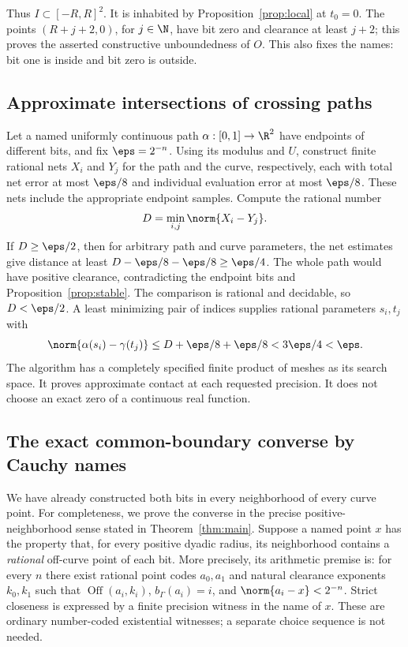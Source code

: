 Thus $I\subset[-R,R]^2$. It is inhabited by
Proposition~\ref{prop:local} at $t_0=0$.
The points $(R+j+2,0)$, for $j\in\N$, have bit zero and
clearance at least $j+2$; this proves the asserted constructive
unboundedness of $O$. This also fixes the names: bit one is
inside and bit zero is outside.

\subsection{Approximate intersections of crossing paths}

Let a named uniformly continuous path $\alpha:[0,1]\to\R^2$
have endpoints of different bits, and fix $\eps=2^{-n}$.
Using its modulus and $U$, construct finite rational nets
$X_i$ and $Y_j$ for the path and the curve, respectively,
each with total net error at most $\eps/8$ and individual
evaluation error at most $\eps/8$. These nets include the
appropriate endpoint samples. Compute the rational number
\[
                         D=\min_{i,j}\norm{X_i-Y_j}.
\]
If $D\ge\eps/2$, then for arbitrary path and curve parameters,
the net estimates give distance at least
$D-\eps/8-\eps/8\ge\eps/4$.
The whole path would have positive clearance, contradicting
the endpoint bits and Proposition~\ref{prop:stable}.
The comparison is rational and decidable, so $D<\eps/2$.
A least minimizing pair of indices supplies rational parameters
$s_i,t_j$ with
\[
 \norm{\alpha(s_i)-\gamma(t_j)}
      \le D+\eps/8+\eps/8<3\eps/4<\eps.
\]
The algorithm has a completely specified finite product of meshes
as its search space. It proves approximate contact at each
requested precision. It does not choose an exact zero of a
continuous real function.

\subsection{The exact common-boundary converse by Cauchy names}
\label{sec:boundary-converse}

We have already constructed both bits in every neighborhood of every
curve point. For completeness, we prove the converse in the precise
positive-neighborhood sense stated in Theorem~\ref{thm:main}.
Suppose a named point $x$ has the property that, for every positive
dyadic radius, its neighborhood contains a \emph{rational}
off-curve point of each bit. More precisely, its arithmetic
premise is: for every $n$ there exist rational point codes
$a_0,a_1$ and natural clearance exponents $k_0,k_1$ such that
$\operatorname{Off}(a_i,k_i)$, $b_\Gamma(a_i)=i$, and
$\norm{a_i-x}<2^{-n}$. Strict closeness is expressed by a
finite precision witness in the name of $x$.
These are ordinary number-coded existential witnesses;
a separate choice sequence is not needed.

